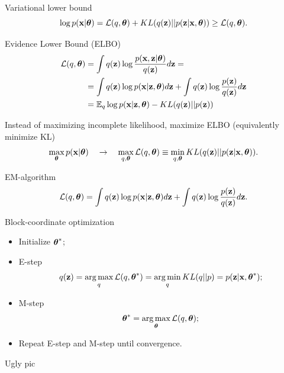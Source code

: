 \begin{frame}{Variational lower bound}
\[
    \log p(\mathbf{x}| \boldsymbol{\theta}) = \mathcal{L} (q, \boldsymbol{\theta}) + KL(q(\mathbf{z}) || p(\mathbf{z}|\mathbf{x}, \boldsymbol{\theta})) \geq \mathcal{L} (q, \boldsymbol{\theta}).
\]
\begin{block}{Evidence Lower Bound (ELBO)}
\begin{align*}
    \mathcal{L} (q, \boldsymbol{\theta}) &= \int q(\mathbf{z}) \log \frac{p(\mathbf{x}, \mathbf{z} | \boldsymbol{\theta})}{q(\mathbf{z})}d\mathbf{z} = \\ 
    &= \int q(\mathbf{z}) \log p(\mathbf{x} | \mathbf{z}, \boldsymbol{\theta}) d\mathbf{z} + \int q(\mathbf{z}) \log \frac{p(\mathbf{z})}{q(\mathbf{z})}d\mathbf{z} \\ 
    &= \mathbb{E}_{q} \log p(\mathbf{x} | \mathbf{z}, \boldsymbol{\theta}) - KL (q(\mathbf{z}) || p(\mathbf{z}))
\end{align*}
\end{block}
Instead of maximizing incomplete likelihood, maximize ELBO (equivalently minimize KL)
\[
    \max_{\boldsymbol{\theta}} p(\mathbf{x} | \boldsymbol{\theta}) \quad \rightarrow \quad \max_{q, \boldsymbol{\theta}} \mathcal{L} (q, \boldsymbol{\theta}) \equiv \min_{q, \boldsymbol{\theta}} KL(q(\mathbf{z}) || p(\mathbf{z}|\mathbf{x}, \boldsymbol{\theta})).
\]
    
\end{frame}
\begin{frame}{EM-algorithm}
	\[
		\mathcal{L} (q, \boldsymbol{\theta})  = \int q(\mathbf{z}) \log p(\mathbf{x} | \mathbf{z}, \boldsymbol{\theta}) d\mathbf{z} + \int q(\mathbf{z}) \log \frac{p(\mathbf{z})}{q(\mathbf{z})}d\mathbf{z}.
	\]
	\begin{block}{Block-coordinate optimization}
	\begin{itemize}
		\item Initialize $\boldsymbol{\theta}^*$;
		\item E-step
		\[
			q(\mathbf{z}) = \operatorname*{arg\,max}_q \mathcal{L} (q, \boldsymbol{\theta}^*) = \operatorname*{arg\,min}_q KL(q || p) =
			 p(\mathbf{z}| \mathbf{x}, \boldsymbol{\theta}^*);
		\]
		\item M-step
		\[
			\boldsymbol{\theta}^* = \operatorname*{arg\,max}_{\boldsymbol{\theta}} \mathcal{L} (q, \boldsymbol{\theta});
		\]
		\item Repeat E-step and M-step until convergence.
	\end{itemize}
	\end{block}
\end{frame}
\begin{frame}{Ugly pic}
\end{frame}
